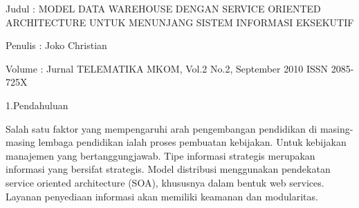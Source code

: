 \documentclass[12pt, times new roman, a4paper]{article}
\begin{document}
Judul       : MODEL DATA WAREHOUSE DENGAN SERVICE ORIENTED   ARCHITECTURE UNTUK MENUNJANG SISTEM INFORMASI EKSEKUTIF

Penulis    : Joko Christian

Volume   : Jurnal TELEMATIKA MKOM, Vol.2 No.2, September 2010 ISSN 2085-725X

1.Pendahuluan

Salah satu faktor yang mempengaruhi arah pengembangan pendidikan di masing-masing lembaga pendidikan ialah proses pembuatan kebijakan. Untuk  kebijakan manajemen yang bertanggungjawab. Tipe informasi  strategis merupakan informasi yang bersifat strategis. 
Model distribusi menggunakan pendekatan service oriented architecture (SOA), khususnya dalam bentuk web services. Layanan penyediaan informasi akan memiliki keamanan dan modularitas.
\end{document}
